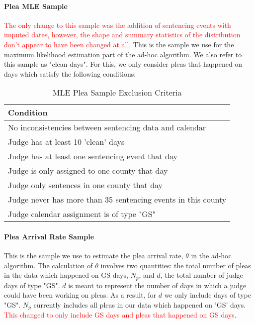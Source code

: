 \documentclass[11pt]{article}
\begin{document}
      \paragraph{Plea MLE Sample} \textcolor{red}{The only change to this sample was the addition of sentencing events with imputed dates, however, the shape and summary statistics of the distribution don't appear to have been changed at all.} This is the sample we use for the maximum likelihood estimation part of the ad-hoc algorithm. We also refer to this sample as "clean days". For this, we only consider pleas that happened on days which satisfy the following conditions:
        \begin{table}[H]
          \centering
          \caption{MLE Plea Sample Exclusion Criteria}
          \begin{tabular}{|l|}
          \hline
          \textbf{Condition}                                                  \\ \hline
          No inconsistencies between sentencing data and calendar \\ \hline
          Judge has at least 10 'clean' days                      \\ \hline
          Judge has at least one sentencing event that day         \\ \hline
          Judge is only assigned to one county that day          \\ \hline
          Judge only sentences in one county that day             \\ \hline
          Judge never has more than 35 sentencing events in this county \\ \hline
          Judge calendar assignment is of type "GS"           \\ \hline
          \end{tabular}
        \end{table}

      \paragraph{Plea Arrival Rate Sample} This is the sample we use to estimate the plea arrival rate, $\theta$ in the ad-hoc algorithm. The calculation of $\theta$ involves two quantities: the total number of pleas in the data which happened on GS days, $N_p$, and $d$, the total number of judge days of type "GS". $d$ is meant to represent the number of days in which a judge could have been working on pleas. As a result, for $d$ we only include days of type "GS". $N_p$ currently includes all pleas in our data which happened on 'GS' days. \textcolor{red}{This changed to only include GS days and pleas that happened on GS days}.
\end{document}
